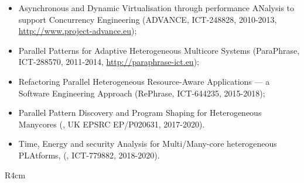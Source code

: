 \documentclass[a4paper,11pt]{article}
\begin{document}
\begin{itemize}
\item
Asynchronous and Dynamic Virtualisation through performance ANalysis to support Concurrency Engineering (ADVANCE,
ICT-248828, 2010-2013, \url{http://www.project-advance.eu});
\item
Parallel Patterns for Adaptive Heterogeneous Multicore Systems (ParaPhrase, ICT-288570, 2011-2014, \url{http://paraphrase-ict.eu});
\item
Refactoring Parallel Heterogeneous Resource-Aware Applications --- a Software Engineering Approach (RePhrase, ICT-644235, 2015-2018);
\item
Parallel Pattern Discovery and Program Shaping for Heterogeneous Manycores (\discovery, UK EPSRC EP/P020631, 2017-2020).
\item
Time,   Energy   and   security   Analysis   for   Multi/Many-core   heterogeneous PLAtforms,   (\teamplay, ICT-779882,  2018-2020).
\end{itemize}



\begin{wrapfigure}{R}{4cm}
\vspace{-2cm}
\hfill {}
\vspace{-1cm}
\end{wrapfigure}

\ 
\end{document}
